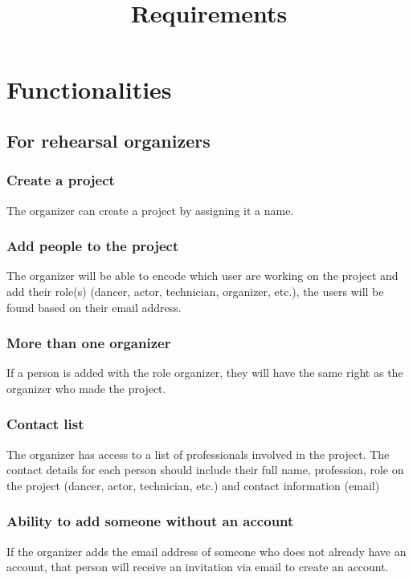 \documentclass[11pt]{article}
\author{}
\begin{document}
\pagestyle{fancy}
\fancyhead{}


\title{\vspace{-1cm}\huge{Requirements}\vspace{-1.7cm}}
\date{}
\maketitle
\thispagestyle{fancy}
\section{Functionalities}
\subsection{For rehearsal organizers}

\subsubsection{Create a project}
The organizer can create a project by assigning it a name.

\subsubsection{Add people to the project}
The organizer will be able to encode which user are working on the project and add their role(s) (dancer, actor, technician, organizer, etc.), the users will be found based on their email address.

\subsubsection{More than one organizer}
If a person is added with the role organizer, they will have the same right as the organizer who made the project.

\subsubsection{Contact list}
The organizer has access to a list of professionals involved in the project. The contact details for each person should include their full name, profession, role on the project (dancer, actor, technician, etc.) and contact information (email)

\subsubsection{Ability to add someone without an account}
If the organizer adds the email address of someone who does not already have an account, that person will receive an invitation via email to create an account.
\end{document}
